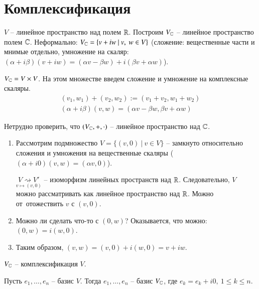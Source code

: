 \documentclass[main]{subfiles}
\begin{document}
\chapter{Комплексификация}

$V$ -- линейное пространство над полем $\mathbb{R}$. Построим $V_{\mathbb{C}}$ -- линейное пространство 
полем $\mathbb{C}$. Неформально: $V_{\mathbb{C}} = \{v +  iw \ | \ v, \ w \in V\}$ (сложение: вещественные части и мнимые отдельно, 
умножение на скаляр: $(\alpha + i\beta) (v + iw) = (\alpha v - \beta w) + i(\beta v + \alpha w)$).

$V_{\mathbb{C}} = V\times V$. На этом множестве введем сложение и умножение на комплексные скаляры.
\begin{gather*}
    (v_1,w_1) + (v_2, w_2) := (v_1 + v_2, w_1 + w_2)  \\
    (\alpha + i\beta) (v, w) = (\alpha v - \beta w, \beta v + \alpha w)
\end{gather*}

Нетрудно проверить, что $(V_{\mathbb{C}}, +, \cdot)$ -- линейное пространство над $\mathbb{C}$.

\begin{enumerate}
    \item Рассмотрим подмножество $V = \{(v, 0) \ | \ v \in V\}$ -- 
    замкнуто относительно сложения и умножения на вещественные скаляры 
    ($(\alpha + i0)(v, w) = (\alpha v, 0)$).
    
    $\underset{v \mapsto (v, 0)}{V \rightsquigarrow V'}$ -- изоморфизм линейных пространств над $\mathbb{R}$. Следовательно, 
    $V$ можно рассматривать как линейное пространство над $\mathbb{R}$. Можно от отожествить $v$ с $(v, 0)$.
    \item Можно ли сделать что-то с $(0, w)$? Оказывается, что можно: $(0, w) = i(w, 0)$.
    \item Таким образом, $(v, w) = (v, 0) + i(w, 0) = v +iw$.
\end{enumerate}

$V_{\mathbb{C}}$ -- комплексификация $V$.

\begin{corollary}
    Пусть $e_1, \ldots, e_n$ -- базис $V$. Тогда $e_1, \ldots, e_n$ -- базис $V_{\mathbb{C}}$, где $e_k = e_k + i0, \ 1 \leqslant k\leqslant n $.
\end{corollary}
\end{document}
